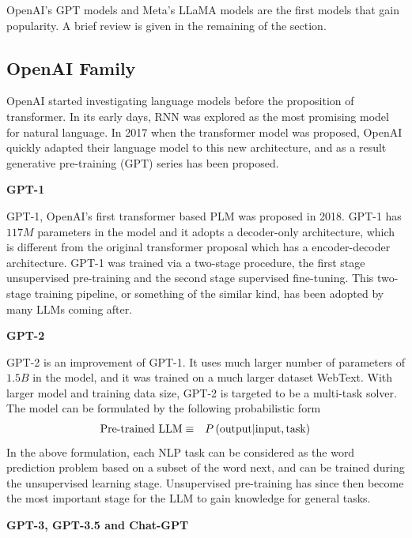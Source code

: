 OpenAI's GPT models and Meta's LLaMA models are the first models that gain popularity. A brief review is given in the remaining of the section.

\subsection{OpenAI Family}

OpenAI started investigating language models before the proposition of transformer. In its early days, RNN was explored as the most promising model for natural language. In 2017 when the transformer model was proposed, OpenAI quickly adapted their language model to this new architecture, and as a result generative pre-training (GPT) series has been proposed.

\vspace{0.1in}
\noindent \textbf{GPT-1}
\vspace{0.1in}

GPT-1, OpenAI's first transformer based PLM was proposed in 2018. GPT-1 has $117M$ parameters in the model and it adopts a decoder-only architecture, which is different from the original transformer proposal which has a encoder-decoder architecture. GPT-1 was trained via a two-stage procedure, the first stage unsupervised pre-training and the second stage supervised fine-tuning. This two-stage training pipeline, or something of the similar kind, has been adopted by many LLMs coming after.

\vspace{0.1in}
\noindent \textbf{GPT-2}
\vspace{0.1in}

GPT-2 is an improvement of GPT-1. It uses much larger number of parameters of $1.5B$ in the model, and it was trained on a much larger dataset WebText. With larger model and training data size, GPT-2 is targeted to be a multi-task solver. The model can be formulated by the following probabilistic form
\begin{eqnarray}
  \textup{Pre-trained LLM} &\equiv& P\left(\textup{output}\middle|\textup{input}, \textup{task}\right) \nonumber
\end{eqnarray}
In the above formulation, each NLP task can be considered as the word prediction problem based on a subset of the word next, and can be trained during the unsupervised learning stage. Unsupervised pre-training has since then become the most important stage for the LLM to gain knowledge for general tasks.

\vspace{0.1in}
\noindent \textbf{GPT-3, GPT-3.5 and Chat-GPT}
\vspace{0.1in}

